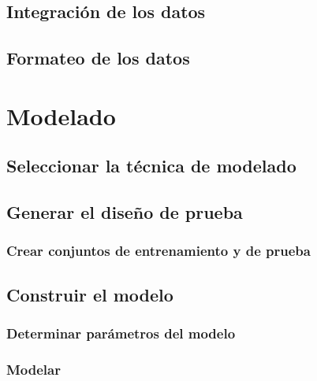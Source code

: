 \documentclass[11pt,a4paper,twoside]{tesis}
\begin{document}
\section{Integración de los datos}
\section{Formateo de los datos}


\chapter{Modelado}
\section{Seleccionar la técnica de modelado}
\section{Generar el diseño de prueba}
\subsection{Crear conjuntos de entrenamiento y de prueba}
\section{Construir el modelo}
\subsection{Determinar parámetros del modelo}
\subsection{Modelar}
\end{document}
